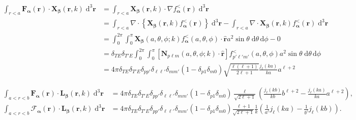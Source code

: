 \begin{equation}
\begin{split}
\int_{r<a}\mathbf{F}_{\bm{\alpha}}(\mathbf{r})\cdot\mathbf{X}_{\bm{\beta}}(\mathbf{r},k)\;\mathrm{d}^3\mathbf{r} &= \int_{r < a}\mathbf{X}_{\bm{\beta}}(\mathbf{r},k)\cdot\nabla f_{\bm{\alpha}}^<(\mathbf{r})\;\mathrm{d}^3\mathbf{r}\\
&= \int_{r < a}\nabla\cdot\left\{\mathbf{X}_{\bm{\beta}}(\mathbf{r},k) f_{\bm{\alpha}}^<(\mathbf{r})\right\}\;\mathrm{d}^3\mathbf{r} - \int_{r < a}\nabla\cdot\mathbf{X}_{\bm{\beta}}(\mathbf{r},k)f_{\bm{\alpha}}^<(\mathbf{r})\;\mathrm{d}^3\mathbf{r}\\
&= \int_0^{2\pi}\int_0^\pi\mathbf{X}_{\bm{\beta}}(a,\theta,\phi;k)f_{\bm{\alpha}}^<(a,\theta,\phi)\cdot \hat{\mathbf{r}}a^2\sin\theta\;\mathrm{d}\theta\,\mathrm{d}\phi - 0\\
&= \delta_{TE}\delta_{T'E}\int_0^{2\pi}\int_0^\pi\left[\mathbf{N}_{p\ell m}(a,\theta,\phi;k)\cdot\hat{\mathbf{r}}\right]f_{p'\ell' m'}^<(a,\theta,\phi)a^2\sin\theta\;\mathrm{d}\theta\,\mathrm{d}\phi\\
&= 4\pi\delta_{TE}\delta_{T'E}\delta_{pp'}\delta_{\ell\ell'}\delta_{mm'}(1 - \delta_{p1}\delta_{m0})\sqrt{\frac{\ell(\ell + 1)}{2\ell + 1}}\frac{j_\ell(ka)}{ka}a^{\ell+2}
\end{split}
\end{equation}

\begin{equation}
\begin{split}
\int_{a<r<b}\mathbf{F}_{\bm{\alpha}}(\mathbf{r})\cdot\mathbf{L}_{\bm{\beta}}(\mathbf{r},k)\;\mathrm{d}^3\mathbf{r} &= 4\pi\delta_{TE}\delta_{T'E}\delta_{pp'}\delta_{\ell\ell'}\delta_{mm'}(1 - \delta_{p1}\delta_{m0})\frac{\ell}{\sqrt{2\ell+1}}\left(\frac{j_\ell(kb)}{kb}b^{\ell+2} - \frac{j_\ell(ka)}{ka}a^{\ell+2}\right),\\
\int_{a<r<b}\bm{\mathcal{F}}_{\bm{\alpha}}(\mathbf{r})\cdot\mathbf{L}_{\bm{\beta}}(\mathbf{r},k)\;\mathrm{d}^3\mathbf{r} &= 4\pi\delta_{TE}\delta_{T'E}\delta_{pp'}\delta_{\ell\ell'}\delta_{mm'}(1 - \delta_{p1}\delta_{m0})\frac{\ell+1}{\sqrt{2\ell+1}}\frac{1}{k}\left(\frac{1}{a^\ell}j_\ell(ka) - \frac{1}{b^\ell}j_\ell(kb)\right).
\end{split}
\end{equation}

